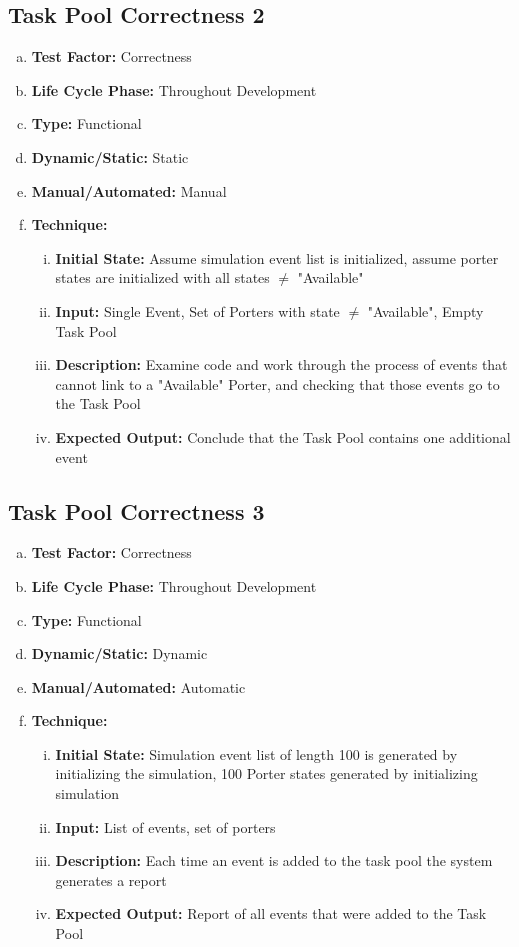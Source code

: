 \documentclass[paper=letter, fontsize=10pt]{scrartcl}
\numberwithin{equation}{section}		%
\numberwithin{figure}{section}			%
\numberwithin{table}{section}				%
\begin{document}
\subsection{Task Pool Correctness 2}
\begin{enumerate}[(a)]
	\item \textbf{Test Factor:} Correctness
	\item \textbf{Life Cycle Phase:} Throughout Development
	\item \textbf{Type:} Functional
	\item \textbf{Dynamic/Static:} Static
	\item \textbf{Manual/Automated:} Manual
	\item \textbf{Technique:}
		\begin{enumerate}[(i)]
			\item \textbf{Initial State:} Assume simulation event list is initialized, assume porter states are initialized with all states $\neq$ "Available"
			\item \textbf{Input:} Single Event, Set of Porters with state $\neq$ "Available", Empty Task Pool
			\item \textbf{Description:} Examine code and work through the process of events that cannot link to a "Available" Porter, and checking that those events go to the Task Pool
			\item \textbf{Expected Output:} Conclude that the Task Pool contains one additional event 
		\end{enumerate}
\end{enumerate}

\subsection{Task Pool Correctness 3}
\begin{enumerate}[(a)]
	\item \textbf{Test Factor:} Correctness
	\item \textbf{Life Cycle Phase:} Throughout Development
	\item \textbf{Type:} Functional
	\item \textbf{Dynamic/Static:} Dynamic
	\item \textbf{Manual/Automated:} Automatic
	\item \textbf{Technique:}
		\begin{enumerate}[(i)]
			\item \textbf{Initial State:} Simulation event list of length 100 is generated by initializing the simulation, 100 Porter states generated by initializing simulation
			\item \textbf{Input:} List of events, set of porters
			\item \textbf{Description:} Each time an event is added to the task pool the system generates a report
			\item \textbf{Expected Output:} Report of all events that were added to the Task Pool
		\end{enumerate}
\end{enumerate}
\end{document}
